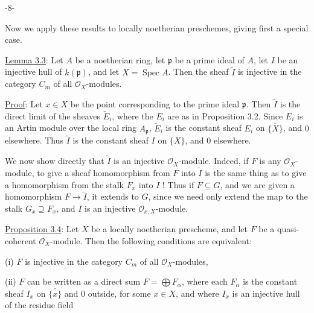 \begin{center}-8-\end{center}

Now we apply these results to locally noetherian preschemes, giving first a special case.

\uline{Lemma 3.3}: Let $A$ be a noetherian ring, let $\mathfrak p$ be a prime ideal of $A$, let $I$ be an injective hull of $k(\mathfrak p)$, and let $X=\operatorname{Spec}A$. Then the sheaf $\widetilde I$ is injective in the category $C_m$ of all $\mathcal O_X$-modules.

\uline{Proof}: Let $x\in X$ be the point corresponding to the prime ideal $\mathfrak p$. Then $\widetilde I$ is the direct limit of the sheaves $\widetilde E_i$, where the $E_i$ are as in Proposition 3.2. Since $E_i$ is an Artin module over the local ring $A_{\mathfrak p}$, $\widetilde E_i$ is the constant sheaf $E_i$ on $\overline{\{X\}}$, and $0$ elsewhere. Thus $\widetilde I$ is the constant sheaf $I$ on $\overline{\{X\}}$, and $0$ elsewhere.

We now show directly that $\widetilde I$ is an injective $\mathcal O_X$-module. Indeed, if $F$ is any $\mathcal O_X$-module, to give a sheaf homomorphism from $F$ into $\widetilde I$ is the same thing as to give a homomorphism from the stalk $F_x$ into $I$ ! Thus if $F\subseteq G$, and we are given a homomorphism $F\longrightarrow\widetilde I$, it extends to $G$, since we need only extend the map to the stalk $G_x\supseteq F_x$, and $I$ is an injective $\mathcal O_{x,X}$-module.

\uline{Proposition 3.4}: Let $X$ be a locally noetherian prescheme, and let $F$ be a quasi-coherent $\mathcal O_X$-module. Then the following conditions are equivalent:

(i) $F$ is injective in the category $C_m$ of all $\mathcal O_X$-modules,

(ii) $F$ can be written as a direct sum $F=\bigoplus F_\alpha$, where each $F_\alpha$ is the constant sheaf $I_x$ on $\overline{\{x\}}$ and $0$ outside, for some $x\in X$, and where $I_x$ is an injective hull of the residue field
